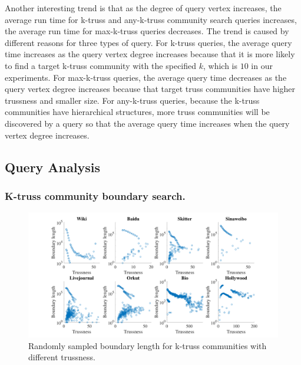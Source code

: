 Another interesting trend is that as the degree of query vertex increases, the average run time for k-truss and any-k-truss community search queries increases, the average run time for max-k-truss queries decreases. The trend is caused by different reasons for three types of query. For k-truss queries, the average query time increases as the query vertex degree increases because that it is more likely to find a target k-truss community with the specified $k$, which is $10$ in our experiments. For max-k-truss queries, the average query time decreases as the query vertex degree increases because that target truss communities have higher trussness and smaller size. For any-k-truss queries, because the k-truss communities have hierarchical structures, more truss communities will be discovered by a query so that the average query time increases when the query vertex degree increases.

\subsection{\BottomLevelProb{} Query Analysis}
\label{eval_bottom_analysis}


\subsubsection{K-truss community boundary search.}

\begin{figure}[ht]
    \centering
    \includegraphics[width=\linewidth]{./figures/boundary_size.pdf}
    \caption{Randomly sampled boundary length for k-truss communities with different trussness.}
    \label{fig:boundary}
\end{figure}

